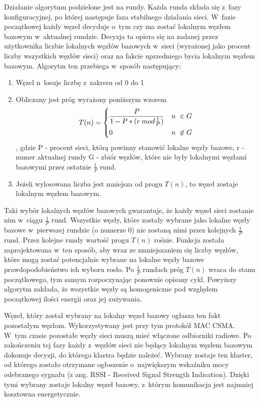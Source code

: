 Działanie algorytmu podzielone jest na rundy. Każda runda składa się z~fazy konfiguracyjnej, po której następuje faza stabilnego działania sieci. W~fazie początkowej każdy węzeł decyduje o~tym czy ma zostać lokalnym węzłem bazowym w~aktualnej rundzie. Decyzja ta opiera się na zadanej przez użytkownika liczbie lokalnych węzłów bazowych w~sieci (wyrażonej jako procent liczby wszystkich węzłów sieci) oraz na fakcie uprzedniego bycia lokalnym węzłem bazowym.
Algorytm ten przebiega w~sposób następujący:
\begin{enumerate}
	\item Węzeł n~losuje liczbę z~zakresu od 0 do 1
	\item Obliczany jest próg wyrażony poniższym wzorem
	\[T(n) = \begin{dcases} 
      \frac{P}{1-P*(r\:mod\frac{1}{P})} & n~\in G \\
      0 & n~\not\in G \\
   \end{dcases}
	\]
	, gdzie P - procent sieci, którą powinny stanowić lokalne węzły bazowe,
	r - numer aktualnej rundy
	G - zbiór węzłów, które nie były lokalnymi węzłami bazowymi przez ostatnie $\frac{1}{P}$ rund.
	\item Jeżeli wylosowana liczba jest mniejsza od progu $T(n)$, to węzeł zostaje lokalnym węzłem bazowym.
\end{enumerate}
Taki wybór lokalnych węzłów bazowych gwarantuje, że każdy węzeł sieci zostanie nim w~ciągu $\frac{1}{P}$ rund. Wszystkie węzły, które zostały wybrane jako lokalne węzły bazowe w~pierwszej rundzie (o numerze 0) nie zostaną nimi przez kolejnych $\frac{1}{P}$ rund. Przez kolejne rundy wartość progu $T(n)$ rośnie. Funkcja została zaprojektowana w~ten sposób, aby wraz ze zmniejszaniem się liczby węzłów, które mogą zostać potencjalnie wybrane na lokalne węzły bazowe prawdopodobieństwo ich wyboru rosło. Po $\frac{1}{P}$ rundach próg $T(n)$ wraca do stanu początkowego, tym samym rozpoczynając ponownie opisany cykl.
Powyższy algorytm zakłada, że wszystkie węzły są homogeniczne pod względem początkowej ilości energii oraz jej zużywania.

Węzeł, który został wybrany na lokalny węzeł bazowy ogłasza ten fakt  pozostałym węzłom. Wykorzystywany jest przy tym protokół MAC CSMA. W~tym czasie pozostałe węzły sieci muszą mieć włączone odbiorniki radiowe. Po zakończeniu tej fazy każdy z~węzłów sieci nie będący lokalnym węzłem bazowym dokonuje decyzji, do którego klastra będzie należeć. Wybrany zostaje ten klaster, od którego zostało otrzymane ogłoszenie o~największym wskaźniku mocy odebranego sygnału (z ang. RSSI - Received Signal Strength Indication). Dzięki tymi wybrany zostaje lokalny węzeł bazowy, z~którym komunikacja jest najmniej kosztowna energetycznie.

